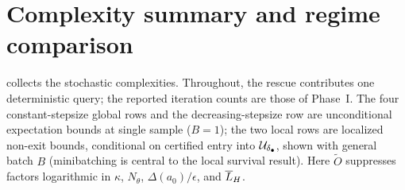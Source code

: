 \section{Complexity summary and regime comparison}
\label{sec:regime-comparison}

 collects the stochastic complexities. Throughout, the rescue contributes one
deterministic query; the reported iteration counts are those of Phase~I. The four constant-stepsize
global rows and the decreasing-stepsize row are unconditional expectation bounds at single sample
($B=1$); the two local rows are localized non-exit bounds, conditional on certified entry into
$\mathcal{U}_{\delta_\bullet}$, shown with general batch $B$ (minibatching is central to the local survival
result). Here $\widetilde O$ suppresses factors logarithmic in $\kappa$, $N_\theta$,
$\Delta(a_0)/\epsilon$, and $\overline{L}_H$.

